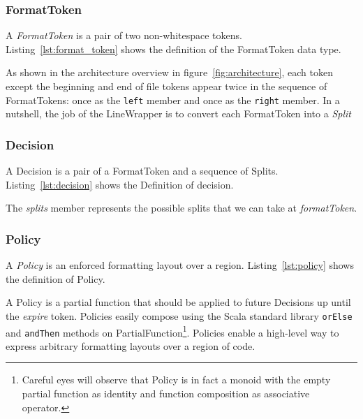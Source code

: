 \subsubsection{FormatToken}
A \emph{FormatToken} is a pair of two non-whitespace tokens.
Listing~\ref{lst:format_token} shows the definition of the FormatToken data type.

As shown in the architecture overview in figure~\ref{fig:architecture}, each token except the beginning and end of file tokens appear twice in the sequence of FormatTokens: once as the \texttt{left} member and once as the \texttt{right} member.
In a nutshell, the job of the LineWrapper is to convert each FormatToken into a \emph{Split}

\subsubsection{Decision}\label{sec:decision}
A Decision is a pair of a FormatToken and a sequence of Splits.
Listing~\ref{lst:decision} shows the Definition of decision.

The \emph{splits} member represents the possible splits that we can take at \emph{formatToken}.

\subsubsection{Policy}\label{sec:policy}
A \emph{Policy} is an enforced formatting layout over a region.
Listing~\ref{lst:policy} shows the definition of Policy.
\begin{minipage}{\linewidth}
  
\end{minipage}
A Policy is a partial function that should be applied to future Decisions up until the \emph{expire} token.
Policies easily compose using the Scala standard library \texttt{orElse} and \texttt{andThen} methods on PartialFunction\footnote{
  Careful eyes will observe that Policy is in fact a monoid with the empty partial function as identity and function composition as associative operator.}.
Policies enable a high-level way to express arbitrary formatting layouts over a region of code.

